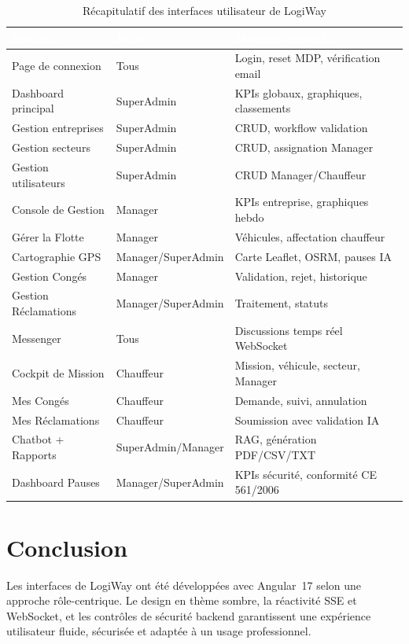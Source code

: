 \documentclass[12pt,a4paper]{report}
\newcommand{\thead}[1]{\cellcolor{tablehead}\textcolor{white}{\textbf{#1}}}
\begin{document}
\begin{table}[H]
  \centering
  \caption{Récapitulatif des interfaces utilisateur de LogiWay}
  \label{tab:interfaces}
  \begin{tabularx}{\textwidth}{|l|l|Y|}
    \hline
    \thead{Interface} & \thead{Rôle} & \thead{Modules couverts} \\
    \hline
    Page de connexion & Tous & Login, reset MDP, vérification email \\
    Dashboard principal & SuperAdmin & KPIs globaux, graphiques, classements \\
    Gestion entreprises & SuperAdmin & CRUD, workflow validation \\
    Gestion secteurs & SuperAdmin & CRUD, assignation Manager \\
    Gestion utilisateurs & SuperAdmin & CRUD Manager/Chauffeur \\
    Console de Gestion & Manager & KPIs entreprise, graphiques hebdo \\
    Gérer la Flotte & Manager & Véhicules, affectation chauffeur \\
    Cartographie GPS & Manager/SuperAdmin & Carte Leaflet, OSRM, pauses IA \\
    Gestion Congés & Manager & Validation, rejet, historique \\
    Gestion Réclamations & Manager/SuperAdmin & Traitement, statuts \\
    Messenger & Tous & Discussions temps réel WebSocket \\
    Cockpit de Mission & Chauffeur & Mission, véhicule, secteur, Manager \\
    Mes Congés & Chauffeur & Demande, suivi, annulation \\
    Mes Réclamations & Chauffeur & Soumission avec validation IA \\
    Chatbot + Rapports & SuperAdmin/Manager & RAG, génération PDF/CSV/TXT \\
    Dashboard Pauses & Manager/SuperAdmin & KPIs sécurité, conformité CE 561/2006 \\
    \hline
  \end{tabularx}
\end{table}

\section{Conclusion}

Les interfaces de LogiWay ont été développées avec Angular~17 selon une
approche rôle-centrique. Le design en thème sombre, la réactivité SSE
et WebSocket, et les contrôles de sécurité backend garantissent une
expérience utilisateur fluide, sécurisée et adaptée à un usage professionnel.
\end{document}
